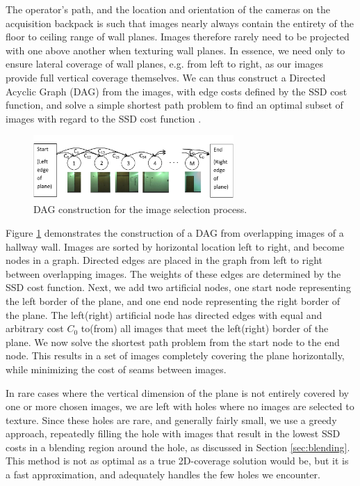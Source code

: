 \documentclass[]{spie}  %
\begin{document}
The operator's path, and the location and orientation of the cameras
on the acquisition backpack is such that images nearly always contain
the entirety of the floor to ceiling range of wall planes. Images
therefore rarely need to be projected with one above another when
texturing wall planes. In essence, we need only to ensure lateral
coverage of wall planes, e.g. from left to right, as our images
provide full vertical coverage themselves. We can thus construct a
Directed Acyclic Graph (DAG) from the images, with edge costs defined
by the SSD cost function, and solve a simple shortest path problem to
find an optimal subset of images with regard to the SSD cost function
\cite{dijkstra}.

\begin{figure}
  \centering
  \includegraphics[width=3in]{dagCreation.pdf}
  \caption{DAG construction for the image selection process. \\}
  \label{fig:dagCreation}
\end{figure}

Figure \ref{fig:dagCreation} demonstrates the construction of a DAG
from overlapping images of a hallway wall. Images are sorted by
horizontal location left to right, and become nodes in a
graph. Directed edges are placed in the graph from left to right
between overlapping images. The weights of these edges are determined
by the SSD cost function. Next, we add two artificial nodes, one start
node representing the left border of the plane, and one end node
representing the right border of the plane. The left(right) artificial
node has directed edges with equal and arbitrary cost $C_0$ to(from)
all images that meet the left(right) border of the plane. We now solve
the shortest path problem from the start node to the end node. This
results in a set of images completely covering the plane horizontally,
while minimizing the cost of seams between images.

In rare cases where the vertical dimension of the plane is not
entirely covered by one or more chosen images, we are left with holes
where no images are selected to texture. Since these holes are rare,
and generally fairly small, we use a greedy approach, repeatedly
filling the hole with images that result in the lowest SSD costs in a
blending region around the hole, as discussed in Section
\ref{sec:blending}. This method is not as optimal as a true
2D-coverage solution would be, but it is a fast approximation, and
adequately handles the few holes we encounter.
\end{document}
